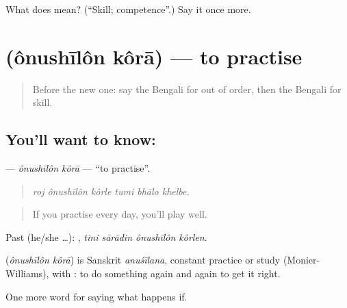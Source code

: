 \begin{tcolorbox}[breakable,colback=teal!4,colframe=teal!35!black,title={Before you move on}]
What does  mean? (\textquotedblleft{}Skill; competence\textquotedblright{}.) Say it once more.
\end{tcolorbox}
\section[\texorpdfstring{\bn{অনুশীলন} \bn{করা} (ônushīlôn kôrā)}{অনুশীলন করা (ônushīlôn kôrā)}]{  (ônushīlôn kôrā) — to practise}

\label{lesson:BN-C381-onushilon-kora}



\begin{quote}
Before the new one: say the Bengali for out of order, then the Bengali for skill.
\end{quote}

\subsection*{You'll want to know:  }
\textbf{ } — \emph{ônushīlôn kôrā} — \textquotedblleft{}to practise\textquotedblright{}.

\begin{quote}
     
\end{quote}

\begin{quote}
\emph{roj ônushīlôn kôrle tumi bhālo khelbe.}
\end{quote}

\begin{quote}
If you practise every day, you'll play well.
\end{quote}

Past (he/she …):    , \emph{tini sārādin ônushīlôn kôrlen}.

\begin{cousinweb}
\textbf{ } (\emph{ônushīlôn kôrā}) is Sanskrit \emph{anuśīlana}, constant practice or study (Monier-Williams), with : to do something again and again to get it right.
\end{cousinweb}

\begin{grammarlens}[title={What you've built}]
One more word for saying what happens if.
\end{grammarlens}

